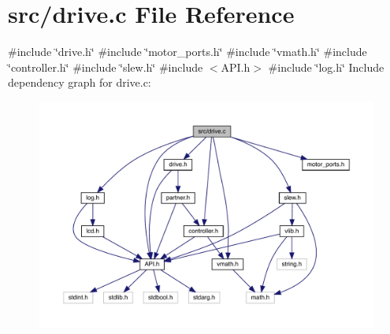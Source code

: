 \section{src/drive.c File Reference}
\label{drive_8c}
{\ttfamily \#include \char`\"{}drive.\+h\char`\"{}}\newline
{\ttfamily \#include \char`\"{}motor\+\_\+ports.\+h\char`\"{}}\newline
{\ttfamily \#include \char`\"{}vmath.\+h\char`\"{}}\newline
{\ttfamily \#include \char`\"{}controller.\+h\char`\"{}}\newline
{\ttfamily \#include \char`\"{}slew.\+h\char`\"{}}\newline
{\ttfamily \#include $<$A\+P\+I.\+h$>$}\newline
{\ttfamily \#include \char`\"{}log.\+h\char`\"{}}\newline
Include dependency graph for drive.\+c\+:\nopagebreak
\begin{figure}[H]
\begin{center}
\leavevmode
\includegraphics[width=350pt]{drive_8c__incl}
\end{center}
\end{figure}
